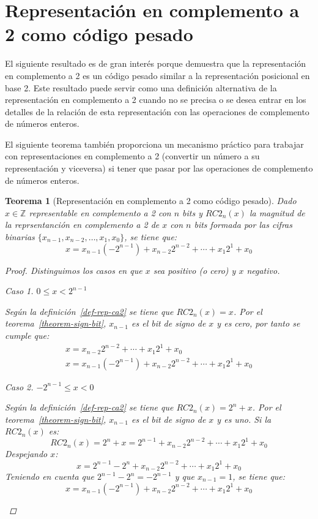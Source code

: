 \documentclass[spanish,a4paper,12pt,titlepage]{article}
\newtheorem{theorem}{Teorema}%
\theoremstyle{definition}
\theoremstyle{remark}
\newtheorem{case}{Caso}
\newcommand{\bbZ}{\mathbb{Z}}
\begin{document}
\section{Representación en complemento a 2 como código pesado}

El siguiente resultado es de gran interés porque demuestra que la representación en complemento a 2 es un código pesado similar a la representación posicional en base 2. Este resultado puede servir como una definición alternativa de la representación en complemento a 2 cuando no se precisa o se desea entrar en los detalles de la relación de esta representación con las operaciones de complemento de números enteros.

El siguiente teorema también proporciona un mecanismo práctico para trabajar con representaciones en complemento a 2 (convertir un número a su representación y viceversa) si tener que pasar por las operaciones de complemento de números enteros.

\begin{theorem}[Representación en complemento a 2 como código pesado]
  Dado $x \in \bbZ$ representable en complemento a 2 con $n$ bits y $RC2_n(x)$ la magnitud de la reprsentanción en complemento a 2 de $x$ con $n$ bits formada por las cifras binarias $\{x_{n-1}, x_{n-2}, \ldots, x_1, x_0\}$, se tiene que:
  \[
      x = x_{n-1} (-2^{n-1})+x_{n-2} 2^{n-2}+ \cdots + x_1 2^1+x_0
  \]
  \begin{proof}
    Distinguimos los casos en que $x$ sea positivo (o cero) y $x$ negativo.

    \begin{case}
      $0 \le x < 2^{n-1}$

      Según la definición~\ref{def-rep-ca2} se tiene que $RC2_n(x) = x$. Por el teorema~\ref{theorem-sign-bit}, $x_{n-1}$ es el bit de signo de $x$ y es cero, por tanto se cumple que:
      \begin{align*}
        x = x_{n-2} 2^{n-2}+ \cdots + x_1 2^1+x_0\\
        x = x_{n-1} (-2^{n-1})+x_{n-2} 2^{n-2}+ \cdots + x_1 2^1+x_0
      \end{align*}
    \end{case}
    \begin{case}
      $-2^{n-1} \le x < 0$

      Según la definición~\ref{def-rep-ca2} se tiene que $RC2_n(x) = 2^n + x$. Por el teorema~\ref{theorem-sign-bit}, $x_{n-1}$ es el bit de signo de $x$ y es uno. Si la $RC2_n(x)$ es:
      \[
        RC2_n(x) = 2^n + x = 2^{n-1}+x_{n-2}2^{n-2}+\cdots+x_1 2^1+x_0
      \]
      Despejando $x$:
      \[
        x = 2^{n-1}-2^n + x_{n-2} 2^{n-2}+ \cdots +x_1 2^1+x_0
      \]
      Teniendo en cuenta que $2^{n-1}-2^n = -2^{n-1}$ y que $x_{n-1}=1$, se tiene que:
      \[
        x = x_{n-1} (-2^{n-1})+x_{n-2} 2^{n-2}+ \cdots + x_1 2^1+x_0
      \]
    \end{case}
  \end{proof}
\end{theorem}
\end{document}

